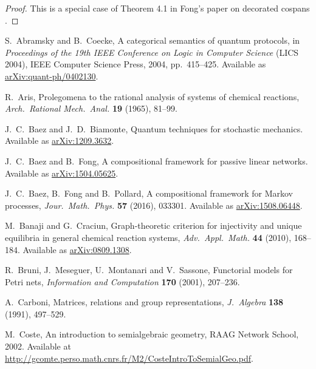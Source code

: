 \documentclass{compositionalityarticle}
\theoremstyle{compositionality}
\theoremstyle{remark}
\begin{document}
\begin{proof}
This is a special case of Theorem 4.1 in Fong's paper on decorated cospans \cite{Fong2015}.  
\end{proof}

\begin{thebibliography}{9}

     S.\ Abramsky and B.\ Coecke, A categorical semantics of quantum protocols, in \textsl{Proceedings of the 19th IEEE Conference on Logic in
 Computer Science} (LICS 2004), IEEE Computer Science Press, 2004, pp.\ 415--425.  Available as \href{http://arxiv.org/abs/quant-ph/0402130}{arXiv:quant-ph/0402130}.

 R.\ Aris, Prolegomena to the rational analysis of systems
of chemical reactions, \textsl{Arch.\ Rational Mech.\ Anal.} {\bf 19} (1965), 81--99.

 J.\ C.\ Baez and J.\ D.\ Biamonte, Quantum techniques for stochastic mechanics. Available as \href{http://arxiv.org/abs/1209.3632}{arXiv:1209.3632}.

 J.\ C.\ Baez and B.\ Fong,  A compositional framework for passive linear networks.   Available as \href{http://arxiv.org/abs/1504.05625}{arXiv:1504.05625}.

  J.\ C.\ Baez, B.\ Fong and B.\ Pollard, A compositional framework for Markov processes, \textsl{Jour.\ Math.\ Phys.} \textbf{57} (2016), 033301.  Available as \href{http://arxiv.org/abs/1508.06448}{arXiv:1508.06448}.

 M.\ Banaji and G.\ Craciun, Graph-theoretic criterion for injectivity and unique equilibria in general chemical reaction systems, \textsl{Adv.\ Appl.\ Math.} \textbf{44} (2010), 168--184. Available as \href{http://arxiv.org/abs/0809.1308}{arXiv:0809.1308}.

 R.\ Bruni, J.\ Meseguer, U.\ Montanari and V.\ Sassone, Functorial models for Petri nets, \textsl{Information and Computation} \textbf{170} (2001), 207--236.

 A.\ Carboni, Matrices, relations and group representations, 
\textsl{J.\ Algebra} \textbf{138} (1991), 497--529.

 M.\ Coste, An introduction to semialgebraic geometry, RAAG Network School, 2002.  Available at \hfill \break \href{http://gcomte.perso.math.cnrs.fr/M2/CosteIntroToSemialGeo.pdf}{http://gcomte.perso.math.cnrs.fr/M2/CosteIntroToSemialGeo.pdf}.


\end{thebibliography}
\end{document}
